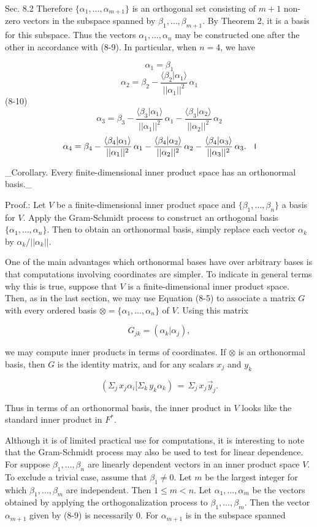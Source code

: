 Sec. 8.2 Therefore \(\{\alpha_{1},\ldots,\alpha_{m+1}\}\) is an orthogonal set consisting of \(m+1\) non-zero vectors in the subspace spanned by \(\beta_{1},\ldots,\beta_{m+1}\). By Theorem 2, it is a basis for this subspace. Thus the vectors \(\alpha_{1},\ldots,\alpha_{n}\) may be constructed one after the other in accordance with (8-9). In particular, when \(n=4\), we have

\[\alpha_{1} = \beta_{1}\] \[\alpha_{2} = \beta_{2}-\frac{\langle\beta_{2}|\alpha_{1}\rangle}{||\alpha_{1} ||^{2}}\,\alpha_{1}\] (8-10) \[\alpha_{3} = \beta_{3}-\frac{\langle\beta_{3}|\alpha_{1}\rangle}{||\alpha_{1} ||^{2}}\,\alpha_{1}-\frac{\langle\beta_{3}|\alpha_{2}\rangle}{||\alpha_{2}||^{ 2}}\,\alpha_{2}\] \[\alpha_{4} = \beta_{4}-\frac{\langle\beta_{4}|\alpha_{1}\rangle}{||\alpha_{1} ||^{2}}\,\alpha_{1}-\frac{\langle\beta_{4}|\alpha_{2}\rangle}{||\alpha_{2}||^{ 2}}\,\alpha_{2}-\frac{\langle\beta_{4}|\alpha_{3}\rangle}{||\alpha_{3}||^{2}} \,\alpha_{3}.\quad\hbox{\vrule width 0.4pt height 6.0pt depth 0.0pt\vrule width 0.4pt height 6.0pt depth 0.0pt}\]

_Corollary. Every finite-dimensional inner product space has an orthonormal basis._

Proof.: Let \(V\) be a finite-dimensional inner product space and \(\{\beta_{1},\ldots,\beta_{n}\}\) a basis for \(V\). Apply the Gram-Schmidt process to construct an orthogonal basis \(\{\alpha_{1},\ldots,\alpha_{n}\}\). Then to obtain an orthonormal basis, simply replace each vector \(\alpha_{k}\) by \(\alpha_{k}/||\alpha_{k}||\). 

One of the main advantages which orthonormal bases have over arbitrary bases is that computations involving coordinates are simpler. To indicate in general terms why this is true, suppose that \(V\) is a finite-dimensional inner product space. Then, as in the last section, we may use Equation (8-5) to associate a matrix \(G\) with every ordered basis \(\otimes=\{\alpha_{1},\ldots,\alpha_{n}\}\) of \(V\). Using this matrix

\[G_{jk}=(\alpha_{k}|\alpha_{j}),\]

we may compute inner products in terms of coordinates. If \(\otimes\) is an orthonormal basis, then \(G\) is the identity matrix, and for any scalars \(x_{j}\) and \(y_{k}\)

\[(\Sigma_{j}\,x_{j}\alpha_{i}[\Sigma_{k}\,y_{k}\alpha_{k})\,=\,\Sigma_{j}\,x_{ j}\vec{y}_{j}.\]

Thus in terms of an orthonormal basis, the inner product in \(V\) looks like the standard inner product in \(F^{*}\).

Although it is of limited practical use for computations, it is interesting to note that the Gram-Schmidt process may also be used to test for linear dependence. For suppose \(\beta_{1},\ldots,\beta_{n}\) are linearly dependent vectors in an inner product space \(V\). To exclude a trivial case, assume that \(\beta_{1}\neq 0\). Let \(m\) be the largest integer for which \(\beta_{1},\ldots,\beta_{m}\) are independent. Then \(1\leq m<n\). Let \(\alpha_{1},\ldots,\alpha_{m}\) be the vectors obtained by applying the orthogonalization process to \(\beta_{1},\ldots,\beta_{m}\). Then the vector \(\alpha_{m+1}\) given by (8-9) is necessarily \(0\). For \(\alpha_{m+1}\) is in the subspace spanned 